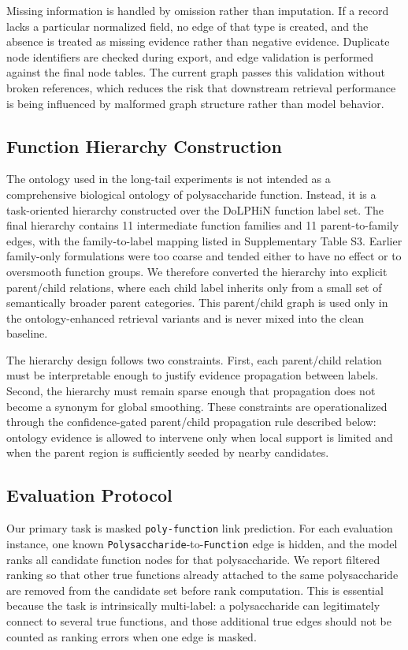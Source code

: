 \documentclass[11pt]{article}
\begin{document}
Missing information is handled by omission rather than imputation. If a record lacks a particular normalized field, no edge of that type is created, and the absence is treated as missing evidence rather than negative evidence. Duplicate node identifiers are checked during export, and edge validation is performed against the final node tables. The current graph passes this validation without broken references, which reduces the risk that downstream retrieval performance is being influenced by malformed graph structure rather than model behavior.

\subsection{Function Hierarchy Construction}
\label{sec:hierarchy-construction}

The ontology used in the long-tail experiments is not intended as a comprehensive biological ontology of polysaccharide function. Instead, it is a task-oriented hierarchy constructed over the DoLPHiN function label set. The final hierarchy contains 11 intermediate function families and 11 parent-to-family edges, with the family-to-label mapping listed in Supplementary Table S3. Earlier family-only formulations were too coarse and tended either to have no effect or to oversmooth function groups. We therefore converted the hierarchy into explicit parent/child relations, where each child label inherits only from a small set of semantically broader parent categories. This parent/child graph is used only in the ontology-enhanced retrieval variants and is never mixed into the clean baseline.

The hierarchy design follows two constraints. First, each parent/child relation must be interpretable enough to justify evidence propagation between labels. Second, the hierarchy must remain sparse enough that propagation does not become a synonym for global smoothing. These constraints are operationalized through the confidence-gated parent/child propagation rule described below: ontology evidence is allowed to intervene only when local support is limited and when the parent region is sufficiently seeded by nearby candidates.

\subsection{Evaluation Protocol}
\label{sec:evaluation-protocol}

Our primary task is masked \texttt{poly-function} link prediction. For each evaluation instance, one known \texttt{Polysaccharide}-to-\texttt{Function} edge is hidden, and the model ranks all candidate function nodes for that polysaccharide. We report filtered ranking so that other true functions already attached to the same polysaccharide are removed from the candidate set before rank computation. This is essential because the task is intrinsically multi-label: a polysaccharide can legitimately connect to several true functions, and those additional true edges should not be counted as ranking errors when one edge is masked.
\end{document}
